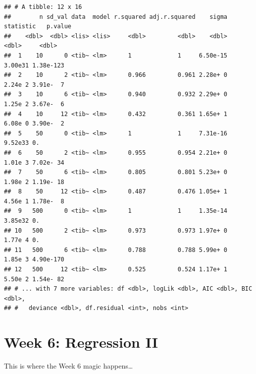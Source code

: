 \documentclass[
]{book}
\begin{document}
\begin{verbatim}
## # A tibble: 12 x 16
##        n sd_val data  model r.squared adj.r.squared    sigma statistic   p.value
##    <dbl>  <dbl> <lis> <lis>     <dbl>         <dbl>    <dbl>     <dbl>     <dbl>
##  1    10      0 <tib~ <lm>      1             1     6.50e-15   3.00e31 1.38e-123
##  2    10      2 <tib~ <lm>      0.966         0.961 2.28e+ 0   2.24e 2 3.91e-  7
##  3    10      6 <tib~ <lm>      0.940         0.932 2.29e+ 0   1.25e 2 3.67e-  6
##  4    10     12 <tib~ <lm>      0.432         0.361 1.65e+ 1   6.08e 0 3.90e-  2
##  5    50      0 <tib~ <lm>      1             1     7.31e-16   9.52e33 0.       
##  6    50      2 <tib~ <lm>      0.955         0.954 2.21e+ 0   1.01e 3 7.02e- 34
##  7    50      6 <tib~ <lm>      0.805         0.801 5.23e+ 0   1.98e 2 1.19e- 18
##  8    50     12 <tib~ <lm>      0.487         0.476 1.05e+ 1   4.56e 1 1.78e-  8
##  9   500      0 <tib~ <lm>      1             1     1.35e-14   3.85e32 0.       
## 10   500      2 <tib~ <lm>      0.973         0.973 1.97e+ 0   1.77e 4 0.       
## 11   500      6 <tib~ <lm>      0.788         0.788 5.99e+ 0   1.85e 3 4.90e-170
## 12   500     12 <tib~ <lm>      0.525         0.524 1.17e+ 1   5.50e 2 1.54e- 82
## # ... with 7 more variables: df <dbl>, logLik <dbl>, AIC <dbl>, BIC <dbl>,
## #   deviance <dbl>, df.residual <int>, nobs <int>
\end{verbatim}

\hypertarget{week-6-regression-ii}{%
\chapter{Week 6: Regression II}\label{week-6-regression-ii}}

This is where the Week 6 magic happens\ldots{}

  
\end{document}
